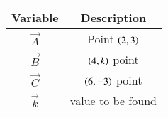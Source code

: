 \begin{tabular}[12pt]{ |c| c|}
    \hline
    \textbf{Variable} & \textbf{Description}\\ 
    \hline
	$\vec{A}$ & Point $\left(2,3\right)$\\
    \hline
	$\vec{B}$ & $\left(4,k\right)$ point\\
    \hline
	$\vec{C}$ & $\left(6,-3\right)$ point\\
    \hline
	$\vec{k}$ & value to be found\\
    \hline
    \end{tabular}
